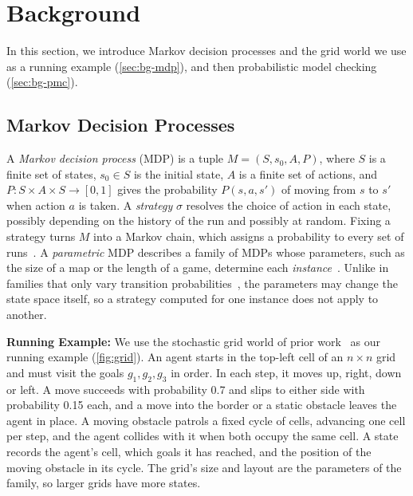 
\section{Background}
\label{sec:background}

In this section, we introduce Markov decision processes and the grid world we use as a running example (\autoref{sec:bg-mdp}), and then probabilistic model checking (\autoref{sec:bg-pmc}).

\subsection{Markov Decision Processes}
\label{sec:bg-mdp}

A \textit{Markov decision process} (MDP) is a tuple $M = (S, s_0, A, P)$, where $S$ is a finite set of states, $s_0 \in S$ is the initial state, $A$ is a finite set of actions, and $P : S \times A \times S \to [0,1]$ gives the probability $P(s, a, s')$ of moving from $s$ to $s'$ when action $a$ is taken.
A \textit{strategy} $\sigma$ resolves the choice of action in each state, possibly depending on the history of the run and possibly at random.
Fixing a strategy turns $M$ into a Markov chain, which assigns a probability to every set of runs~\cite{TODO-Baier2008-principles}.
A \textit{parametric} MDP describes a family of MDPs whose parameters, such as the size of a map or the length of a game, determine each \textit{instance}~\cite{TODO-Azeem2025-123Go}.
Unlike in families that only vary transition probabilities~\cite{TODO-Andriushchenko2024-PoliciesGrowOnTrees}, the parameters may change the state space itself, so a strategy computed for one instance does not apply to another.

\textbf{Running Example:}
We use the stochastic grid world of prior work~\cite{TODO-predecessor-LLMTrust2026} as our running example (\autoref{fig:grid}).
An agent starts in the top-left cell of an $n \times n$ grid and must visit the goals $g_1, g_2, g_3$ in order.
In each step, it moves up, right, down or left.
A move succeeds with probability 0.7 and slips to either side with probability 0.15 each, and a move into the border or a static obstacle leaves the agent in place.
A moving obstacle patrols a fixed cycle of cells, advancing one cell per step, and the agent collides with it when both occupy the same cell.
A state records the agent's cell, which goals it has reached, and the position of the moving obstacle in its cycle.
The grid's size and layout are the parameters of the family, so larger grids have more states.


